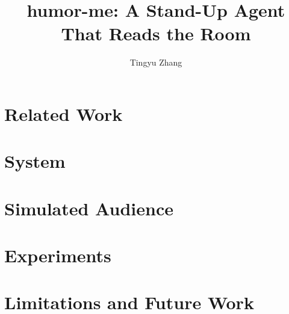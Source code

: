 \documentclass[11pt]{article}
\title{humor-me: A Stand-Up Agent That Reads the Room}
\author{Tingyu Zhang}
\date{}
\begin{document}
\maketitle



\section{Related Work}\label{sec:related}
\section{System}\label{sec:system}
\section{Simulated Audience}\label{sec:sim}
\section{Experiments}\label{sec:experiments}
\section{Limitations and Future Work}\label{sec:limitations}



\end{document}
